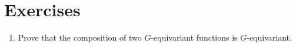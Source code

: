 \documentclass[book.tex]{subfiles}
\begin{document}




\section{Exercises}
\begin{enumerate}
    \item Prove that the composition of two $G$-equivariant functions is $G$-equivariant.
\end{enumerate}
\end{document}
